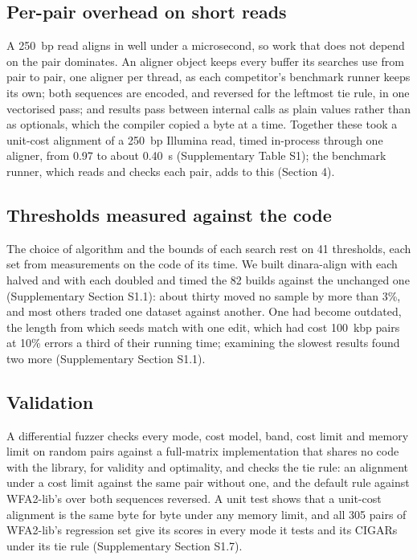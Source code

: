 \documentclass[nocrop,noinfo]{bioinfo}
\begin{document}
\subsection{Per-pair overhead on short reads}

A 250~bp read aligns in well under a microsecond, so work that does not depend on the pair dominates. An aligner object keeps every buffer its searches use from pair to pair, one aligner per thread, as each competitor's benchmark runner keeps its own; both sequences are encoded, and reversed for the leftmost tie rule, in one vectorised pass; and results pass between internal calls as plain values rather than as optionals, which the compiler copied a byte at a time. Together these took a unit-cost alignment of a 250~bp Illumina read, timed in-process through one aligner, from 0.97 to about 0.40~\textmu s (Supplementary Table S1); the benchmark runner, which reads and checks each pair, adds to this (Section 4).

\subsection{Thresholds measured against the code}

The choice of algorithm and the bounds of each search rest on 41 thresholds, each set from measurements on the code of its time. We built dinara-align with each halved and with each doubled and timed the 82 builds against the unchanged one (Supplementary Section S1.1): about thirty moved no sample by more than 3\%, and most others traded one dataset against another. One had become outdated, the length from which seeds match with one edit, which had cost 100~kbp pairs at 10\% errors a third of their running time; examining the slowest results found two more (Supplementary Section S1.1).

\subsection{Validation}

A differential fuzzer checks every mode, cost model, band, cost limit and memory limit on random pairs against a full-matrix implementation that shares no code with the library, for validity and optimality, and checks the tie rule: an alignment under a cost limit against the same pair without one, and the default rule against WFA2-lib's over both sequences reversed. A unit test shows that a unit-cost alignment is the same byte for byte under any memory limit, and all 305 pairs of WFA2-lib's regression set give its scores in every mode it tests and its CIGARs under its tie rule (Supplementary Section S1.7).
\end{document}
